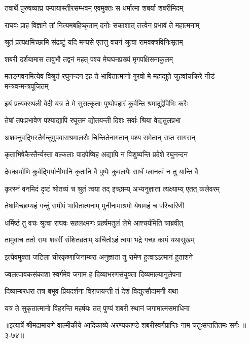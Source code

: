 \twolineshloka
{तवार्थे पुरुषव्याघ्र पम्पायास्तीरसम्भवम्}
{एवमुक्तः स धर्मात्मा शबर्या शबरीमिदम्} %

\twolineshloka
{राघवः प्राह विज्ञाने तां नित्यमबहिष्कृताम्}
{दनोः सकाशात् तत्त्वेन प्रभावं ते महात्मनाम्} %

\twolineshloka
{श्रुतं प्रत्यक्षमिच्छामि संद्रष्टुं यदि मन्यसे}
{एतत्तु वचनं श्रुत्वा रामवक्त्रविनिःसृतम्} %

\twolineshloka
{शबरी दर्शयामास तावुभौ तद्वनं महत्}
{पश्य मेघघनप्रख्यं मृगपक्षिसमाकुलम्} %

\threelineshloka
{मतङ्गवनमित्येव विश्रुतं रघुनन्दन}
{इह ते भावितात्मानो गुरवो मे महाद्युते}
{जुहवांचक्रिरे नीडं मन्त्रवन्मन्त्रपूजितम्} %

\twolineshloka
{इयं प्रत्यक्स्थली वेदी यत्र ते मे सुसत्कृताः}
{पुष्पोपहारं कुर्वन्ति श्रमादुद्वेपिभिः करैः} %

\twolineshloka
{तेषां तपःप्रभावेण पश्याद्यापि रघूत्तम}
{द्योतयन्ती दिशः सर्वाः श्रिया वेद्यतुलप्रभा} %

\twolineshloka
{अशक्नुवद्भिस्तैर्गन्तुमुपवासश्रमालसैः}
{चिन्तितेनागतान् पश्य समेतान् सप्त सागरान्} %

\twolineshloka
{कृताभिषेकैस्तैर्न्यस्ता वल्कलाः पादपेष्विह}
{अद्यापि न विशुष्यन्ति प्रदेशे रघुनन्दन} %

\twolineshloka
{देवकार्याणि कुर्वद्भिर्यानीमानि कृतानि वै}
{पुष्पैः कुवलयैः सार्धं म्लानत्वं न तु यान्ति वै} %

\twolineshloka
{कृत्स्नं वनमिदं दृष्टं श्रोतव्यं च श्रुतं त्वया}
{तद् इच्छाम्य् अभ्यनुज्ञाता त्यक्ष्याम्य् एतत् कलेवरम्} %

\twolineshloka
{तेषामिच्छाम्यहं गन्तुं समीपं भावितात्मनाम्}
{मुनीनामाश्रमो येषामहं च परिचारिणी} %

\twolineshloka
{धर्मिष्ठं तु वचः श्रुत्वा राघवः सहलक्ष्मणः}
{प्रहर्षमतुलं लेभे आश्चर्यमिति चाब्रवीत्} %

\twolineshloka
{तामुवाच ततो रामः शबरीं संशितव्रताम्}
{अर्चितोऽहं त्वया भद्रे गच्छ कामं यथासुखम्} %

\twolineshloka
{इत्येवमुक्ता जटिला चीरकृष्णाजिनाम्बरा}
{अनुज्ञाता तु रामेण हुत्वाऽऽत्मानं हुताशने} %

\twolineshloka
{ज्वलत्पावकसंकाशा स्वर्गमेव जगाम ह}
{दिव्याभरणसंयुक्ता दिव्यमाल्यानुलेपना} %

\twolineshloka
{दिव्याम्बरधरा तत्र बभूव प्रियदर्शना}
{विराजयन्ती तं देशं विद्युत्सौदामनी यथा} %

\twolineshloka
{यत्र ते सुकृतात्मानो विहरन्ति महर्षयः}
{तत् पुण्यं शबरी स्थानं जगामात्मसमाधिना} %


॥इत्यार्षे श्रीमद्रामायणे वाल्मीकीये आदिकाव्ये अरण्यकाण्डे शबरीस्वर्गप्राप्तिः नाम चतुःसप्ततितमः सर्गः ॥३-७४॥

